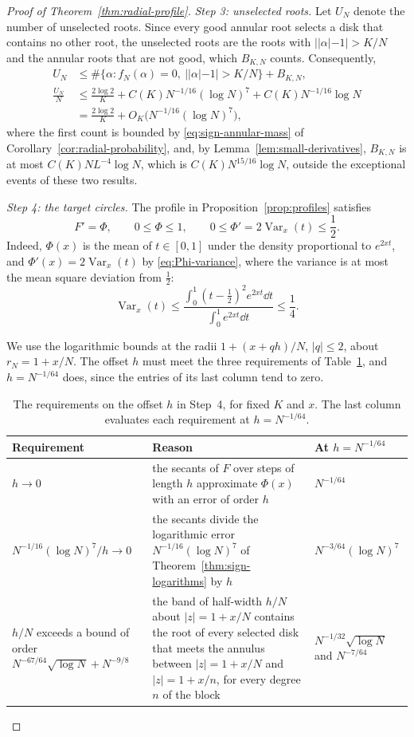 \begin{proof}[Proof of Theorem~\ref{thm:radial-profile}]
\emph{Step 3: unselected roots.}
Let $U_N$ denote the number of unselected roots.
Since every good annular root selects a disk that contains no other
root, the unselected roots are the roots with $||\alpha|-1|>K/N$ and the
annular roots that are not good, which $B_{K,N}$ counts. Consequently,
\begin{align}
 U_N
 &\le\#\{\alpha:f_N(\alpha)=0,\ ||\alpha|-1|>K/N\}+B_{K,N},\nonumber\\
 \frac{U_N}{N}
 &\le\frac{2\log2}{K}+C(K)N^{-1/16}(\log N)^7+C(K)N^{-1/16}\log N\nonumber\\
 &=\frac{2\log2}{K}+O_K\bigl(N^{-1/16}(\log N)^7\bigr),
 \label{eq:unit-unselected}
\end{align}
where the first count is bounded by \eqref{eq:sign-annular-mass} of
Corollary~\ref{cor:radial-probability}, and, by
Lemma~\ref{lem:small-derivatives}, $B_{K,N}$ is at most
$C(K)NL^{-4}\log N$, which is $C(K)N^{15/16}\log N$, outside the
exceptional events of these two results.

\emph{Step 4: the target circles.}
The profile in Proposition~\ref{prop:profiles} satisfies
\[
 F'=\Phi,\qquad 0\le\Phi\le1,\qquad
 0\le\Phi'=2\operatorname{Var}_x(t)\le\frac12.
\]
Indeed, $\Phi(x)$ is the mean of $t\in[0,1]$ under the density
proportional to $e^{2xt}$, and $\Phi'(x)=2\operatorname{Var}_x(t)$ by
\eqref{eq:Phi-variance}, where the variance is at most the mean square
deviation from $\frac12$:
\[
 \operatorname{Var}_x(t)
 \le\frac{\int_0^1(t-\frac12)^2e^{2xt}\dd t}{\int_0^1e^{2xt}\dd t}
 \le\frac14.
\]

We use the logarithmic bounds at the radii $1+(x+qh)/N$, $|q|\le2$,
about $r_N=1+x/N$. The offset $h$ must meet the three requirements of
Table~\ref{tab:moving-offset}, and $h=N^{-1/64}$ does, since the entries
of its last column tend to zero.

\begin{table}[ht]
\centering
\small
\begin{tabular}{@{}>{\raggedright\arraybackslash}p{}
>{\raggedright\arraybackslash}p{}
>{\raggedright\arraybackslash}p{}@{}}
\toprule
Requirement & Reason & At $h=N^{-1/64}$\\
\midrule
$h\to0$ & the secants of $F$ over steps of length $h$ approximate
 $\Phi(x)$ with an error of order $h$ & $N^{-1/64}$\\[2pt]
$N^{-1/16}(\log N)^7/h\to0$ & the secants divide the logarithmic error
 $N^{-1/16}(\log N)^7$ of Theorem~\ref{thm:sign-logarithms} by $h$
 & $N^{-3/64}(\log N)^7$\\[2pt]
$h/N$ exceeds a bound of order $N^{-67/64}\sqrt{\log N}+N^{-9/8}$
 & the band of half-width $h/N$ about $|z|=1+x/N$ contains the root of
 every selected disk that meets the annulus between $|z|=1+x/N$ and
 $|z|=1+x/n$, for every degree $n$ of the block
 & $N^{-1/32}\sqrt{\log N}$ and $N^{-7/64}$\\
\bottomrule
\end{tabular}
\caption{The requirements on the offset $h$ in Step~4, for fixed $K$ and
$x$. The last column evaluates each requirement at $h=N^{-1/64}$.}
\label{tab:moving-offset}
\end{table}


\end{proof}
